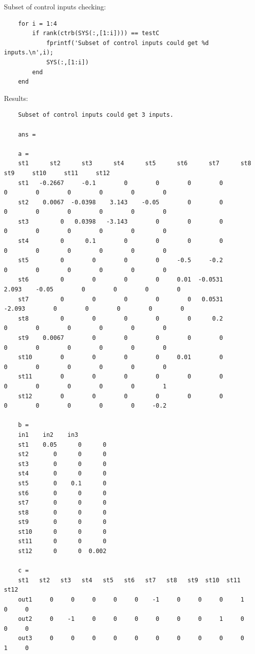 \documentclass[14pt,a4paper]{article}
\begin{document}
	Subset of control inputs checking:
	\begin{lstlisting}
	for i = 1:4
		if rank(ctrb(SYS(:,[1:i]))) == testC
			fprintf('Subset of control inputs could get %d inputs.\n',i);
			SYS(:,[1:i])
		end
	end
	\end{lstlisting}
	Results:
	\begin{lstlisting}
	Subset of control inputs could get 3 inputs.
	
	ans =
	
	a = 
	st1      st2      st3      st4      st5      st6      st7      st8      st9     st10     st11     st12
	st1   -0.2667     -0.1        0        0        0        0        0        0        0        0        0        0
	st2    0.0067  -0.0398    3.143    -0.05        0        0        0        0        0        0        0        0
	st3         0   0.0398   -3.143        0        0        0        0        0        0        0        0        0
	st4         0      0.1        0        0        0        0        0        0        0        0        0        0
	st5         0        0        0        0     -0.5     -0.2        0        0        0        0        0        0
	st6         0        0        0        0     0.01  -0.0531    2.093    -0.05        0        0        0        0
	st7         0        0        0        0        0   0.0531   -2.093        0        0        0        0        0
	st8         0        0        0        0        0      0.2        0        0        0        0        0        0
	st9    0.0067        0        0        0        0        0        0        0        0        0        0        0
	st10        0        0        0        0     0.01        0        0        0        0        0        0        0
	st11        0        0        0        0        0        0        0        0        0        0        0        1
	st12        0        0        0        0        0        0        0        0        0        0        0     -0.2
	
	b = 
	in1    in2    in3
	st1    0.05      0      0
	st2       0      0      0
	st3       0      0      0
	st4       0      0      0
	st5       0    0.1      0
	st6       0      0      0
	st7       0      0      0
	st8       0      0      0
	st9       0      0      0
	st10      0      0      0
	st11      0      0      0
	st12      0      0  0.002
	
	c = 
	st1   st2   st3   st4   st5   st6   st7   st8   st9  st10  st11  st12
	out1     0     0     0     0     0    -1     0     0     0     1     0     0
	out2     0    -1     0     0     0     0     0     0     1     0     0     0
	out3     0     0     0     0     0     0     0     0     0     0     1     0
	

\end{lstlisting}
\end{document}
